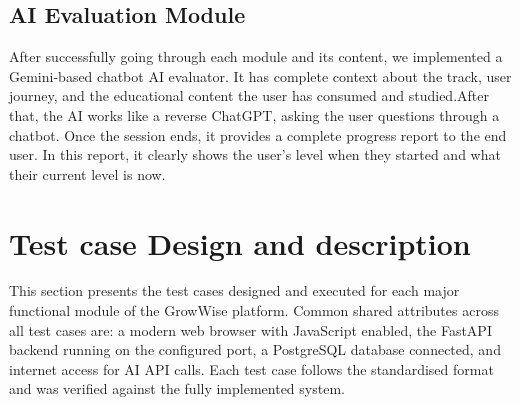 \documentclass{FastFyp}
\begin{document}
\subsection{AI Evaluation Module}
After successfully going through each module and its content, we implemented a Gemini-based chatbot AI evaluator. It has complete context about the track, user journey, and the educational content the user has consumed and studied.After that, the AI works like a reverse ChatGPT, asking the user questions through a chatbot. Once the session ends, it provides a complete progress report to the end user. In this report, it clearly shows the user’s level when they started and what their current level is now.



\section{Test case Design and description}

This section presents the test cases designed and executed for each major functional module of the GrowWise platform. Common shared attributes across all test cases are: a modern web browser with JavaScript enabled, the FastAPI backend running on the configured port, a PostgreSQL database connected, and internet access for AI API calls. Each test case follows the standardised format and was verified against the fully implemented system.
\end{document}
